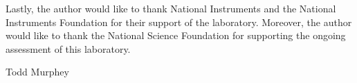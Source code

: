 Lastly, the author would like to thank National Instruments and the National
Instruments Foundation for their support of the laboratory.  Moreover, the
author would like to thank the National Science Foundation for supporting the
ongoing assessment of this laboratory.


\noindent Todd Murphey





